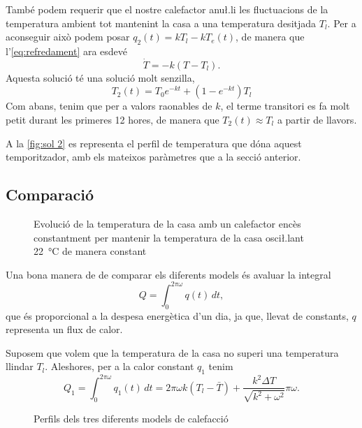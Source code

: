 \documentclass[12pt]{article}
\numberwithin{table}{section}
\numberwithin{figure}{section}
\numberwithin{equation}{section}
\begin{document}
També podem requerir que el nostre calefactor anu\l.li les fluctuacions de la temperatura ambient tot mantenint la casa a una temperatura desitjada \( T_l \). Per a aconseguir això podem posar \( q_2(t) = kT_l - kT_e(t) \), de manera que l'\cref{eq:refredament} ara esdevé
\begin{equation*} 
	\dot{T} = -k(T - T_l).
\end{equation*}
Aquesta solució té una solució molt senzilla,
\begin{equation} \label{eq:solucio 2}
	T_2(t) = T_0e^{-kt} + \left(1 - e^{-kt}\right)T_l
\end{equation}
Com abans, tenim que per a valors raonables de \( k \), el terme transitori es fa molt petit durant les primeres 12 hores, de manera que \( T_2(t) \approx T_l \) a partir de llavors. 

A la \cref{fig:sol 2} es representa el perfil de temperatura que dóna aquest temporitzador, amb els mateixos paràmetres que a la secció anterior. 

\subsection{Comparació}
\begin{figure}[tb]
	\small \sffamily \centering
	
	\caption{Evolució de la temperatura de la casa amb un calefactor encès constantment per mantenir la temperatura de la casa osci\l.lant \SI{22}{\celsius} de manera constant}
	\label{fig:sol 3}
\end{figure}

Una bona manera de de comparar els diferents models és avaluar la integral
\begin{equation*}
	Q =	\int_0^{2\pi \omega} q(t) \, dt,
\end{equation*}
que és proporcional a la despesa energètica d'un dia, ja que, llevat de constants, \( q \) representa un flux de calor.   

Suposem que volem que la temperatura de la casa no superi una temperatura llindar \( T_l \). Aleshores, per a la calor constant \( q_1 \) tenim
\begin{equation} \label{eq:consum 1}
	Q_1 = \int_0^{2\pi \omega} q_1(t) \, dt = 2\pi\omega k(T_l - \bar{T}) + \frac{k^2 \Delta T}{\sqrt{k^2 + \omega^2}} \pi \omega.
\end{equation}

\begin{figure}[htb]
	\small \sffamily \centering
	
	\caption{Perfils dels tres diferents models de calefacció}
	\label{fig:calors}
\end{figure}
\end{document}
